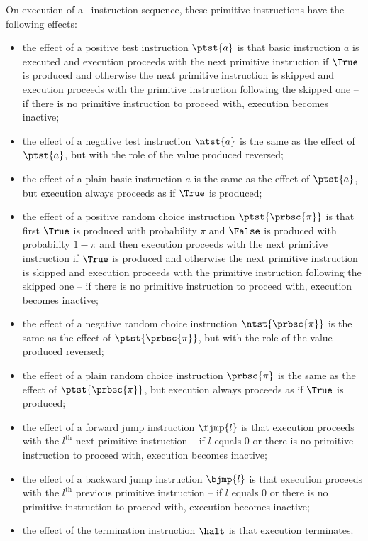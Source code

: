 \documentclass{llncs}
\begin{document}
On execution of a \prPGLB\ instruction sequence, these primitive
instructions have the following effects:
\begin{itemize}
\item
the effect of a positive test instruction $\ptst{a}$ is that basic
instruction $a$ is executed and execution proceeds with the next
primitive instruction if $\True$ is produced and otherwise the next
primitive instruction is skipped and execution proceeds with the
primitive instruction following the skipped one -- if there is no
primitive instruction to proceed with, execution becomes inactive;
\item
the effect of a negative test instruction $\ntst{a}$ is the same as the
effect of $\ptst{a}$, but with the role of the value produced reversed;
\item
the effect of a plain basic instruction $a$ is the same as the effect of
$\ptst{a}$, but execution always proceeds as if $\True$ is produced;
\item
the effect of a positive random choice instruction $\ptst{\prbsc{\pi}}$ 
is that first $\True$ is produced with probability $\pi$ and $\False$ is 
produced with probability $1 - \pi$ and then execution proceeds with the 
next primitive instruction if $\True$ is produced and otherwise the next
primitive instruction is skipped and execution proceeds with the
primitive instruction following the skipped one -- if there is no
primitive instruction to proceed with, execution becomes inactive;
\item
the effect of a negative random choice instruction $\ntst{\prbsc{\pi}}$ 
is the same as the effect of $\ptst{\prbsc{\pi}}$, but with the role of 
the value produced reversed;
\item
the effect of a plain random choice instruction $\prbsc{\pi}$ is the 
same as the effect of $\ptst{\prbsc{\pi}}$, but execution always 
proceeds as if $\True$ is produced;
\item
the effect of a forward jump instruction $\fjmp{l}$ is that execution
proceeds with the $l^\mathrm{th}$ next primitive instruction -- if $l$
equals $0$ or there is no primitive instruction to proceed with,
execution becomes inactive;
\item
the effect of a backward jump instruction $\bjmp{l}$ is that execution
proceeds with the $l^\mathrm{th}$ previous primitive instruction -- if
$l$ equals $0$ or there is no primitive instruction to proceed with,
execution becomes inactive;
\item
the effect of the termination instruction $\halt$ is that execution 
terminates.
\end{itemize}
\end{document}
